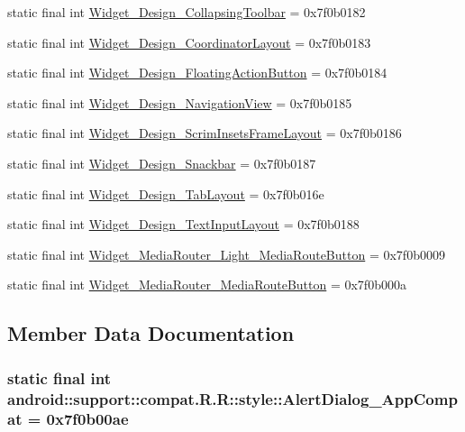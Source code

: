 \begin{CompactItemize}
\item 
static final int \hyperlink{classandroid_1_1support_1_1compat_1_1_r_1_1style_5713101edb788d28d8f2e49f2fad03c9}{Widget\_\-Design\_\-CollapsingToolbar} = 0x7f0b0182
\item 
static final int \hyperlink{classandroid_1_1support_1_1compat_1_1_r_1_1style_59379aeb08770f45bf2f258398ee7465}{Widget\_\-Design\_\-CoordinatorLayout} = 0x7f0b0183
\item 
static final int \hyperlink{classandroid_1_1support_1_1compat_1_1_r_1_1style_45e492ce72c31fe7118e5238233d2670}{Widget\_\-Design\_\-FloatingActionButton} = 0x7f0b0184
\item 
static final int \hyperlink{classandroid_1_1support_1_1compat_1_1_r_1_1style_46267195ebdc1ca7b236cb8e593d1948}{Widget\_\-Design\_\-NavigationView} = 0x7f0b0185
\item 
static final int \hyperlink{classandroid_1_1support_1_1compat_1_1_r_1_1style_386af388992e34322aa06eedd432a6c0}{Widget\_\-Design\_\-ScrimInsetsFrameLayout} = 0x7f0b0186
\item 
static final int \hyperlink{classandroid_1_1support_1_1compat_1_1_r_1_1style_bc81645e5afc44298527eee0e85c8dab}{Widget\_\-Design\_\-Snackbar} = 0x7f0b0187
\item 
static final int \hyperlink{classandroid_1_1support_1_1compat_1_1_r_1_1style_743382a9b6b8ea2d4836cc6dfc97abe2}{Widget\_\-Design\_\-TabLayout} = 0x7f0b016e
\item 
static final int \hyperlink{classandroid_1_1support_1_1compat_1_1_r_1_1style_11e4875aea45993e59b6793bb8de5299}{Widget\_\-Design\_\-TextInputLayout} = 0x7f0b0188
\item 
static final int \hyperlink{classandroid_1_1support_1_1compat_1_1_r_1_1style_5d85c0ca44683deac797a7ddf20efa28}{Widget\_\-MediaRouter\_\-Light\_\-MediaRouteButton} = 0x7f0b0009
\item 
static final int \hyperlink{classandroid_1_1support_1_1compat_1_1_r_1_1style_f0c1a064a3d02b09f3139b99937f8913}{Widget\_\-MediaRouter\_\-MediaRouteButton} = 0x7f0b000a
\end{CompactItemize}


\subsection{Member Data Documentation}
\hypertarget{classandroid_1_1support_1_1compat_1_1_r_1_1style_bc943a5d06fb6e925b99aef327ef5a25}{
\subsubsection[{AlertDialog\_\-AppCompat}]{\setlength{\rightskip}{0pt plus 5cm}static final int android::support::compat.R.R::style::AlertDialog\_\-AppCompat = 0x7f0b00ae}}
\label{classandroid_1_1support_1_1compat_1_1_r_1_1style_bc943a5d06fb6e925b99aef327ef5a25}



